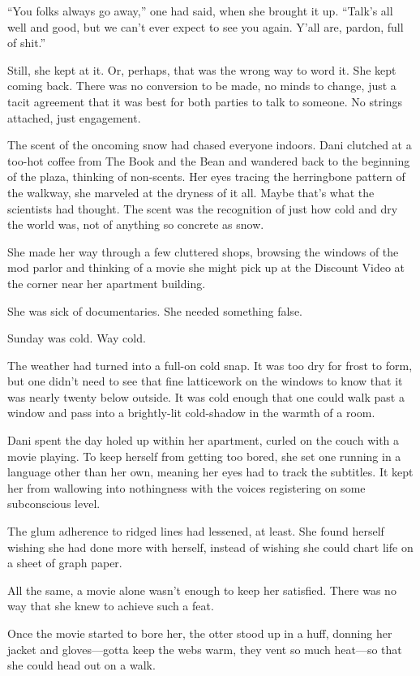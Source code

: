 ``You folks always go away,'' one had said, when she brought it up. ``Talk's all well and good, but we can't ever expect to see you again. Y'all are, pardon, full of shit.''

Still, she kept at it. Or, perhaps, that was the wrong way to word it. She kept coming back. There was no conversion to be made, no minds to change, just a tacit agreement that it was best for both parties to talk to someone. No strings attached, just engagement.

The scent of the oncoming snow had chased everyone indoors. Dani clutched at a too-hot coffee from The Book and the Bean and wandered back to the beginning of the plaza, thinking of non-scents. Her eyes tracing the herringbone pattern of the walkway, she marveled at the dryness of it all. Maybe that's what the scientists had thought. The scent was the recognition of just how cold and dry the world was, not of anything so concrete as snow.

She made her way through a few cluttered shops, browsing the windows of the mod parlor and thinking of a movie she might pick up at the Discount Video at the corner near her apartment building.

She was sick of documentaries. She needed something false.

\secdiv{}

\noindent Sunday was cold. Way cold.

The weather had turned into a full-on cold snap. It was too dry for frost to form, but one didn't need to see that fine latticework on the windows to know that it was nearly twenty below outside. It was cold enough that one could walk past a window and pass into a brightly-lit cold-shadow in the warmth of a room.

Dani spent the day holed up within her apartment, curled on the couch with a movie playing. To keep herself from getting too bored, she set one running in a language other than her own, meaning her eyes had to track the subtitles. It kept her from wallowing into nothingness with the voices registering on some subconscious level.

The glum adherence to ridged lines had lessened, at least. She found herself wishing she had done more with herself, instead of wishing she could chart life on a sheet of graph paper.

All the same, a movie alone wasn't enough to keep her satisfied. There was no way that she knew to achieve such a feat.

Once the movie started to bore her, the otter stood up in a huff, donning her jacket and gloves---gotta keep the webs warm, they vent so much heat---so that she could head out on a walk.

